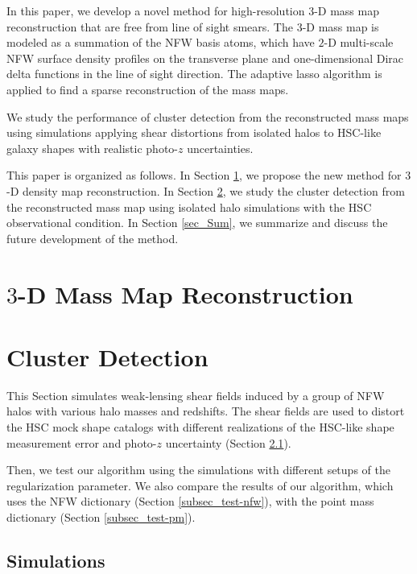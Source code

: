 \documentclass[twocolumn]{aastex63}
\begin{document}
In this paper, we develop a novel method for high-resolution $3$-D mass map
reconstruction that are free from line of sight smears.  The $3$-D
mass map is modeled as a summation of the NFW \citep{halo-NFW1997ApJ} basis
atoms, which have $2$-D multi-scale NFW surface density profiles on the
transverse plane and one-dimensional Dirac delta functions in the line of sight
direction. The adaptive lasso algorithm \citep{AdaLASSO-Zou2006} is applied to
find a sparse reconstruction of the mass maps.

We study the performance of cluster detection from the reconstructed mass maps
using simulations applying shear distortions from isolated halos to HSC-like
galaxy shapes with realistic photo-$z$ uncertainties.


This paper is organized as follows.
In Section \ref{sec_Method}, we propose the new method for $3$-D density map
reconstruction.
In Section \ref{sec_Test}, we study the cluster detection from the
reconstructed mass map using isolated halo simulations with the HSC
observational condition.
In Section \ref{sec_Sum}, we summarize and discuss the future development of
the method.


\section{$3$-D Mass Map Reconstruction}
\label{sec_Method}



\section{Cluster Detection}
\label{sec_Test}

This Section simulates weak-lensing shear fields induced by a group of NFW
halos with various halo masses and redshifts. The shear fields are used to
distort the HSC mock shape catalogs with different realizations of the HSC-like
shape measurement error and photo-$z$ uncertainty (Section \ref{subsec_Sims}).

Then, we test our algorithm using the simulations with different setups of the
regularization parameter. We also compare the results of our algorithm, which
uses the NFW dictionary (Section \ref{subsec_test-nfw}), with the point mass
dictionary (Section \ref{subsec_test-pm}).

\subsection{Simulations}
\label{subsec_Sims}

\end{document}
